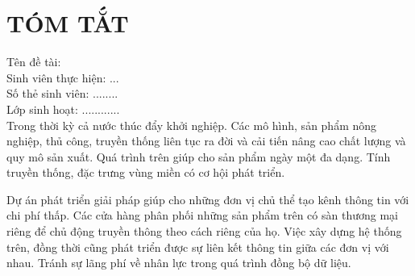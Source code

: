 \clearpage
{}
\chapter*{TÓM TẮT}
\fontsize{13px}{13px}\selectfont\justifying

\raggedright
Tên đề tài: \project\\
Sinh viên thực hiện: ...\me \dotfill\\
Số thẻ sinh viên: ........ \msv \dotfill\\
Lớp sinh hoạt: ............ \myclass \dotfill\\
\vspace{14px}
\justifying
Trong thời kỳ cả nước thúc đẩy khởi nghiệp. Các mô hình, sản phẩm nông nghiệp, thủ công, truyền thống liên tục ra đời và cải tiến nâng cao chất lượng và quy mô sản xuất. Quá trình trên giúp cho sản phẩm ngày một đa dạng. Tính truyền thống, đặc trưng vùng miền có cơ hội phát triển.

Dự án phát triển giải pháp giúp cho những đơn vị chủ thể tạo kênh thông tin với chi phí thấp. Các cửa hàng phân phối những sản phẩm trên có sàn thương mại riêng để chủ động truyền thông theo cách riêng của họ. Việc xây dựng hệ thống trên, đồng thời cũng phát triển được sự liên kết thông tin giữa các đơn vị với nhau. Tránh sự lãng phí về nhân lực trong quá trình đồng bộ dữ liệu.

	
\pagebreak
	